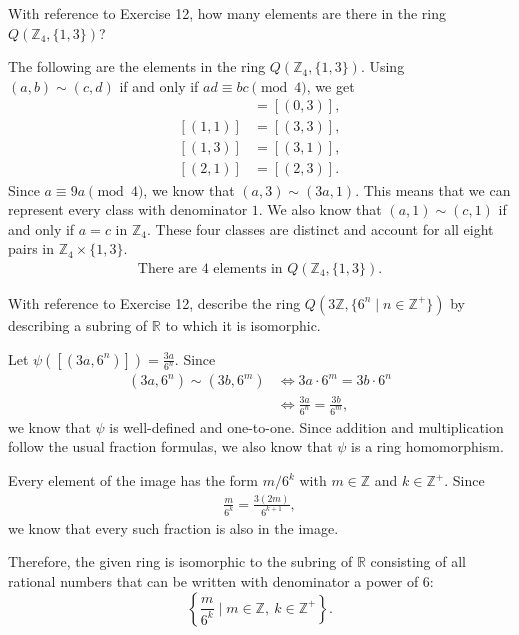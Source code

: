 \documentclass[11pt]{article}
\begin{document}
\begin{problem}[21.14]
With reference to Exercise 12, how many elements are there in the ring $Q(\mathbb{Z}_4, \{1,3\})$?

\begin{solution}
The following are the elements in the ring $Q(\mathbb{Z}_4, \{1,3\})$. Using $(a,b)\sim(c,d)$ if and only if $ad\equiv bc\pmod{4}$, we get
\begin{align*}
    [(0,1)] &= [(0,3)],\\
    [(1,1)] &= [(3,3)],\\
    [(1,3)] &= [(3,1)],\\
    [(2,1)] &= [(2,3)].
\end{align*}
Since $a \equiv 9a \pmod{4}$, we know that $(a,3) \sim (3a,1)$. This means that we can represent every class with denominator $1$. We also know that $(a,1) \sim (c,1)$ if and only if $a=c$ in $\mathbb{Z}_4$.
These four classes are distinct and account for all eight pairs in $\mathbb{Z}_4\times\{1,3\}$.
\begin{align*}
\boxed{\text{There are 4 elements in } Q(\mathbb{Z}_4,\{1,3\}).}
\end{align*}
\end{solution}
\end{problem}

\begin{problem}[21.16]
With reference to Exercise 12, describe the ring $Q(3\mathbb{Z}, \{6^n \mid n \in \mathbb{Z}^+\})$ by describing a subring of $\mathbb{R}$ to which it is isomorphic.

\begin{solution}
Let $\psi([(3a,6^n)]) = \frac{3a}{6^n}$. Since
\begin{align*}
    (3a,6^n) \sim (3b,6^m)
    &\iff 3a\cdot 6^m = 3b\cdot 6^n\\
    &\iff \frac{3a}{6^n} = \frac{3b}{6^m},
\end{align*}
we know that $\psi$ is well-defined and one-to-one. Since addition and multiplication follow the usual fraction formulas, we also know that $\psi$ is a ring homomorphism.

Every element of the image has the form $m/6^k$ with $m \in \mathbb{Z}$ and $k \in \mathbb{Z}^+$. Since
\begin{align*}
    \frac{m}{6^k} = \frac{3(2m)}{6^{k+1}},
\end{align*}
we know that every such fraction is also in the image.

Therefore, the given ring is isomorphic to the subring of
$\mathbb{R}$ consisting of all rational numbers that can be
written with denominator a power of $6$:
\[
    \boxed{\left\{\frac{m}{6^k} \mid m \in \mathbb{Z},\
    k \in \mathbb{Z}^+\right\}.}
\]
\end{solution}
\end{problem}
\end{document}
